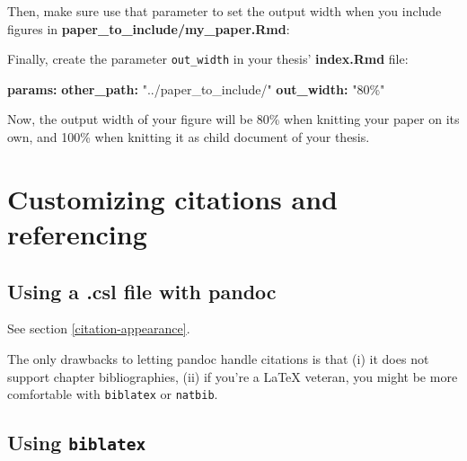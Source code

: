 \documentclass[a4paper, nobind]{templates/ociamthesis}
\newenvironment{Shaded}{\begin{snugshade}}{\end{snugshade}}
\newcommand{\AttributeTok}[1]{\textcolor[rgb]{0.13,0.29,0.53}{#1}}
\newcommand{\FunctionTok}[1]{\textcolor[rgb]{0.13,0.29,0.53}{\textbf{#1}}}
\newcommand{\InformationTok}[1]{\textcolor[rgb]{0.56,0.35,0.01}{\textbf{\textit{#1}}}}
\newcommand{\KeywordTok}[1]{\textcolor[rgb]{0.13,0.29,0.53}{\textbf{#1}}}
\newcommand{\StringTok}[1]{\textcolor[rgb]{0.31,0.60,0.02}{#1}}
\renewenvironment{Shaded}
{
  \vspace{10pt}%
  \begin{snugshade}%
}{%
  \end{snugshade}%
  \vspace{8pt}%
}
\begin{document}
Then, make sure use that parameter to set the output width when you include figures in \textbf{paper\_to\_include/my\_paper.Rmd}:

\begin{Shaded}
\end{Shaded}

Finally, create the parameter \texttt{out\_width} in your thesis' \textbf{index.Rmd} file:

\begin{Shaded}
\begin{Highlighting}[]
\FunctionTok{params}\KeywordTok{:}
\AttributeTok{  }\FunctionTok{other\_path}\KeywordTok{:}\AttributeTok{ }\StringTok{"../paper\_to\_include/"}
\AttributeTok{  }\FunctionTok{out\_width}\KeywordTok{:}\AttributeTok{ }\StringTok{"80\%"}
\end{Highlighting}
\end{Shaded}

Now, the output width of your figure will be 80\% when knitting your paper on its own, and 100\% when knitting it as child document of your thesis.

\section{Customizing citations and referencing}\label{customising-citations}

\subsection{Using a .csl file with pandoc}\label{using-a-.csl-file-with-pandoc}

See section \ref{citation-appearance}.

The only drawbacks to letting pandoc handle citations is that (i) it does not support chapter bibliographies, (ii) if you're a LaTeX veteran, you might be more comfortable with \texttt{biblatex} or \texttt{natbib}.

\subsection{\texorpdfstring{Using \texttt{biblatex}}{Using biblatex}}\label{biblatex-custom}
\end{document}
